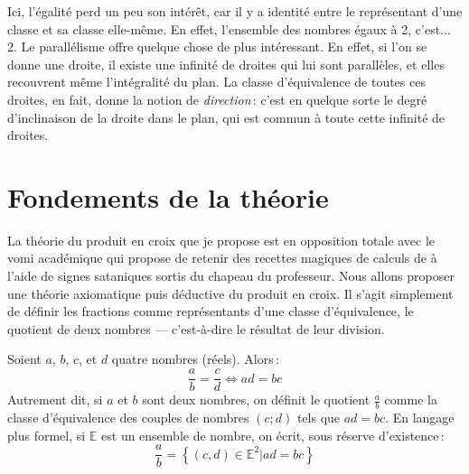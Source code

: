 		Ici, l'égalité perd un peu son intérêt, car il y a identité entre le représentant d'une classe et sa classe elle-même. En effet, l'ensemble des nombres égaux à 2, c'est... 2. Le parallélisme offre quelque chose de plus intéressant. En effet, si l'on se donne une droite, il existe une infinité de droites qui lui sont parallèles, et elles recouvrent même l'intégralité du plan. La classe d'équivalence de toutes ces droites, en fait, donne la notion de \emph{direction}\,: c'est en quelque sorte le degré d'inclinaison de la droite dans le plan, qui est commun à toute cette infinité de droites.



	\section{Fondements de la théorie}\label{sec_fond}
		La théorie du produit en croix que je propose est en opposition totale avec le vomi académique qui propose de retenir des recettes magiques de calculs de  à l'aide de signes sataniques sortis du chapeau du professeur. Nous allons proposer une théorie axiomatique puis déductive du produit en croix. Il s'agit simplement de définir les fractions comme représentants d'une classe d'équivalence, le quotient de deux nombres --- c'est-à-dire le résultat de leur division.
		\begin{axi}
			Soient $a$, $b$, $c$, et $d$ quatre nombres (réels). Alors\,:
			\begin{equation}
				\boxed{\frac{a}{b}=\frac{c}{d} \Leftrightarrow ad=bc}
			\end{equation}
			Autrement dit, si $a$ et $b$ sont deux nombres, on définit le quotient $\frac{a}{b}$ comme la classe d'équivalence des couples de nombres $(c;d)$ tels que $ad=bc$. En langage plus formel, si $\mathbb{E}$ est un ensemble de nombre, on écrit, sous réserve d'existence\,:
			\begin{equation}
				\frac{a}{b}=\left\{ (c,d)\in\mathbb{E}^2|ad=bc\right\}			
			\end{equation}
		\end{axi}


